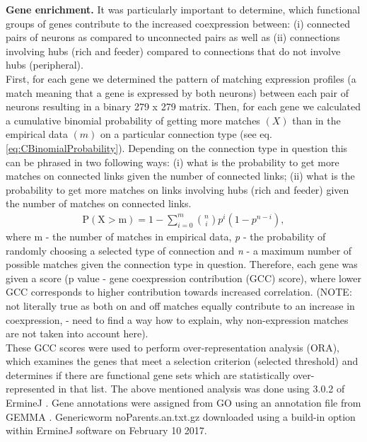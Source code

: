 \documentclass[10pt,letterpaper]{article}
\begin{document}
\textbf{Gene enrichment.}
It was particularly important to determine, which functional groups of genes contribute to the increased coexpression between: (i) connected pairs of neurons as compared to unconnected pairs as well as (ii) connections involving hubs (rich and feeder) compared to connections that do not involve hubs (peripheral). \\
First, for each gene we determined the pattern of matching expression profiles (a match meaning that a gene is expressed by both neurons) between each pair of neurons resulting in a binary 279 x 279 matrix.
Then, for each gene we calculated a cumulative binomial probability of getting more matches $(X)$ than in the empirical data $(m)$ on a particular connection type (see eq. \ref{eq:CBinomialProbability}). 
Depending on the connection type in question this can be phrased in two following ways: (i) what is the probability to get more matches on connected links given the number of connected links; (ii) what is the probability to get more matches on links involving hubs (rich and feeder) given the number of matches on connected links. 
\begin{eqnarray}
	\label{eq:CBinomialProbability}
     \mathrm{P(X>m)} = 1 - \sum_{\textit{i}=0}^{m}\binom{n}{i} p^{\textit{i}}(1-p^{n-\textit{i}}), 
\end{eqnarray}
where m - the number of matches in empirical data, \textit{p} - the probability of randomly choosing a selected type of connection and \textit{n} - a maximum number of possible matches given the connection type in question. 
Therefore, each gene was given a score (p value - gene coexpression contribution (GCC) score), where lower GCC corresponds to higher contribution towards increased correlation. 
(NOTE: not literally true as both on and off matches equally contribute to an increase in coexpression, - need to find a way how to explain, why non-expression matches are not taken into account here). \\
These GCC scores were used to perform over-representation analysis (ORA), which examines the genes that meet a selection criterion (selected threshold) and determines if there are functional gene sets which are statistically over-represented in that list. 
The above mentioned analysis was done using 3.0.2 of ErmineJ \cite{Gillis2010}. 
Gene annotations were assigned from GO \cite{Ashburner2000} using an annotation file from GEMMA \cite{Zoubarev2012}.  
Generic\textunderscore worm \textunderscore noParents.an.txt.gz downloaded using a build-in option within ErmineJ software on February 10 2017. 
\end{document}
